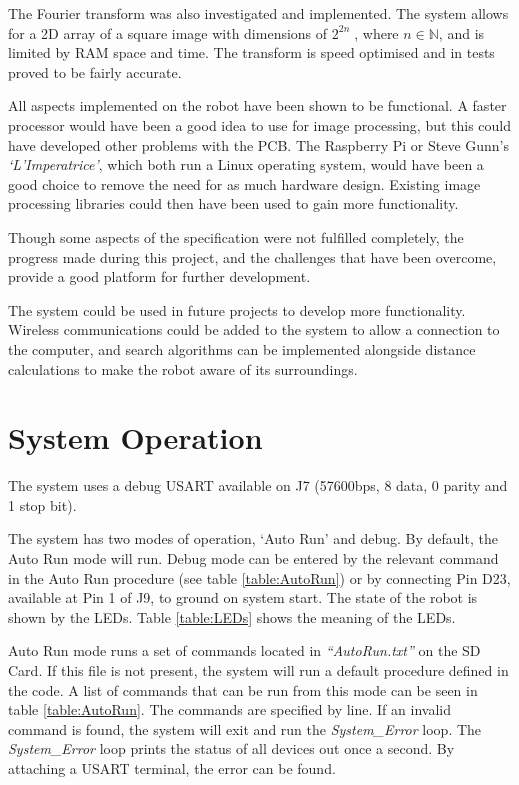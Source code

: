 The Fourier transform was also investigated and implemented. The system allows for a 2D array of a square image with dimensions of $2^{2n}\; $, where $n \in \mathbb{N}$, and is limited by RAM space and time. The transform is speed optimised and in tests proved to be fairly accurate. 

All aspects implemented on the robot have been shown to be functional. A faster processor would have been a good idea to use for image processing, but this could have developed other problems with the PCB. The Raspberry Pi or Steve Gunn's \textit{`L'Imperatrice'}, which both run a Linux operating system, would have been a good choice to remove the need for as much hardware design. Existing image processing libraries could then have been used to gain more functionality. 

Though some aspects of the specification were not fulfilled completely, the progress made during this project, and the challenges that have been overcome, provide a good platform for further development.

The system could be used in future projects to develop more functionality. Wireless communications could be added to the system to allow a connection to the computer, and search algorithms can be implemented alongside distance calculations to make the robot aware of its surroundings. 

\section{System Operation}

The system uses a debug USART available on J7 (57600bps, 8 data, 0 parity and 1 stop bit).

The system has two modes of operation, `Auto Run' and debug. By default, the Auto Run mode will run. Debug mode can be entered by the relevant command in the Auto Run procedure (see table \ref{table:AutoRun}) or by connecting Pin D23, available at Pin 1 of J9, to ground on system start. The state of the robot is shown by the LEDs. Table \ref{table:LEDs} shows the meaning of the LEDs.

Auto Run mode runs a set of commands located in \textit{``AutoRun.txt''} on the SD Card. If this file is not present, the system will run a default procedure defined in the code. A list of commands that can be run from this mode can be seen in table \ref{table:AutoRun}. The commands are specified by line. If an invalid command is found, the system will exit and run the \textit{System\_Error} loop. The  \textit{System\_Error} loop prints the status of all devices out once a second. By attaching a USART terminal, the error can be found.

